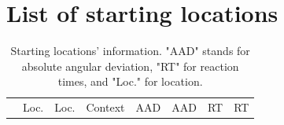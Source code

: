 \chapter{List of starting locations}\label{appx:starting_locations}

\begin{longtable}{lrllrrrr}
	\hiderowcolors
	\caption[Starting locations' information]{Starting locations' information. "AAD" stands for absolute angular deviation, "RT" for reaction times, and "Loc." for location.} \\
	\hline \hline
	\multicolumn{1}{l}{} & \multicolumn{1}{l}{\small Loc.} & \multicolumn{1}{l}{\small Loc.} & \multicolumn{1}{l}{\small Context} & \multicolumn{1}{l}{\small AAD} & \multicolumn{1}{r}{\small AAD} & \multicolumn{1}{l}{\small RT} & \multicolumn{1}{r}{\small RT} \\
	

\end{longtable}
